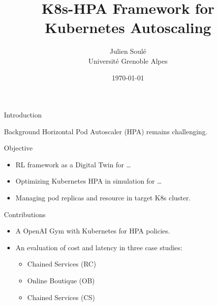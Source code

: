 \documentclass{beamer}
\title{K8s-HPA Framework for Kubernetes Autoscaling}
\author{Julien Soulé \\ Université Grenoble Alpes}
\date{\today}
\begin{document}
\begin{frame}
    \titlepage
\end{frame}

\begin{frame}{Introduction}
    \begin{block}{Background}
        Horizontal Pod Autoscaler (HPA) remains challenging.
    \end{block}
    \begin{block}{Objective}
        \begin{itemize}
            \item  RL framework as a Digital Twin for \dots
            \item  Optimizing Kubernetes HPA in simulation for \dots
            \item  Managing pod replicas and resource in target K8s cluster.
        \end{itemize}

    \end{block}
    \begin{block}{Contributions}
        \begin{itemize}
            \item A OpenAI Gym with Kubernetes for HPA policies.
            \item An evaluation of cost and latency in three case studies:
            \begin{itemize}
                \item Chained Services (RC)
                \item Online Boutique (OB)
                \item Chained Services (CS)
            \end{itemize}
        \end{itemize}
    \end{block}
\end{frame}
\end{document}
